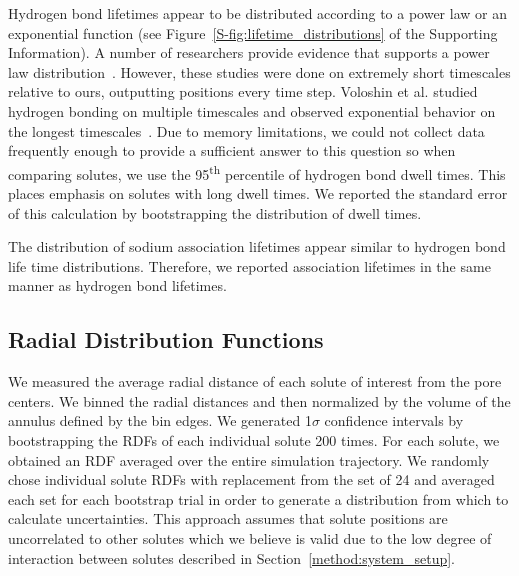 \documentclass[journal=jpcbfk,manuscript=article]{achemso}
\begin{document}
  Hydrogen bond lifetimes appear to be distributed according to a power law or an
  exponential function (see Figure~\ref{S-fig:lifetime_distributions} of the 
  Supporting Information). A number of researchers provide evidence that supports a 
  power law distribution~\cite{starr_fast_1999,martiniano_insights_2013}. However, these
  studies were done on extremely short timescales relative to ours, outputting positions
  every time step. Voloshin et al. studied hydrogen bonding on multiple timescales and 
  observed exponential behavior on the longest timescales~\cite{voloshin_hydrogen_2009}. 
  Due to memory limitations, we could not collect data frequently enough to provide a
  sufficient answer to this question so when comparing solutes, we use the 95\textsuperscript{th} 
  percentile of hydrogen bond dwell times. This places emphasis on solutes with 
  long dwell times. We reported the standard error of this calculation by bootstrapping
  the distribution of dwell times.
  
  The distribution of sodium association lifetimes appear similar to
  hydrogen bond life time distributions. Therefore, we reported association
  lifetimes in the same manner as hydrogen bond lifetimes.
  
  \subsection{Radial Distribution Functions}\label{method:rdfs}

  We measured the average radial distance of each solute of interest 
  from the pore centers. We binned the radial distances and then 
  normalized by the volume of the annulus defined by the bin edges.
  We generated 1$\sigma$ confidence intervals by bootstrapping the 
  RDFs of each individual solute 200 times. For each solute, we obtained
  an RDF averaged over the entire simulation trajectory. We randomly 
  chose individual solute RDFs with replacement from the set of 24 and averaged 
  each set for each bootstrap
  trial in order to generate a distribution from which to calculate uncertainties. 
  This approach assumes that solute positions are uncorrelated to
  other solutes which we believe is valid due to the low degree of 
  interaction between solutes described in Section~\ref{method:system_setup}.
  
\end{document}
